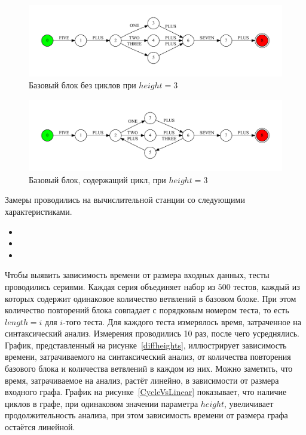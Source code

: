 \begin{figure}[h!]
 \centering
 \includegraphics[width=15cm]{pics/block.pdf}
 \caption{Базовый блок без циклов при $height=3$}
 \label{block}
\end{figure}

\begin{figure}[h!]
 \centering
 \includegraphics[width=15cm]{pics/block_loop.pdf}
 \caption{Базовый блок, содержащий цикл, при $height=3$}
 \label{block_loop}
\end{figure}

Замеры проводились на вычислительной станции со следующими характеристиками.
\begin{itemize}
\item
\item 
\item 
\end{itemize}

Чтобы выявить зависимость времени от размера входных данных, тесты проводились сериями. Каждая серия объединяет набор из $500$ тестов, каждый из которых содержит одинаковое количество ветвлений в базовом блоке. При этом количество повторений блока совпадает с порядковым номером теста, то есть $length=i$ для $i$-того теста. Для каждого теста измерялось время, затраченное на синтаксический анализ. Измерения проводились 10 раз, после чего усреднялись. График, представленный на рисунке~\ref{diffheights}, иллюстрирует зависимость времени, затрачиваемого на синтаксический анализ, от количества повторения базового блока и количества ветвлений в каждом из них. Можно заметить, что время, затрачиваемое на анализ, растёт линейно, в зависимости от размера входного графа. График на рисунке~\ref{CycleVsLinear} показывает, что наличие циклов в графе, при одинаковом значении параметра $height$, увеличивает продолжительность анализа, при этом зависимость времени от размера графа остаётся линейной.

